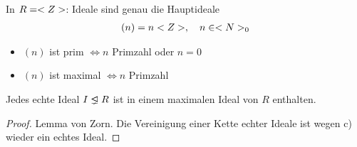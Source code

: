\begin{example}
	In $R = <Z>$: Ideale sind genau die Hauptideale
	\begin{align}
		(n) = n<Z>,\quad n \in <N>_0\notag
	\end{align}
	\begin{itemize}
		\item $(n)$ ist prim $\Leftrightarrow n$ Primzahl oder $n = 0$
		\item $(n)$ ist maximal $\Leftrightarrow n$ Primzahl
	\end{itemize}
\end{example}

\begin{proposition}
	Jedes echte Ideal $I \properideal R$ ist in einem maximalen Ideal von $R$ enthalten.
\end{proposition}
\begin{proof}
	Lemma von Zorn. Die Vereinigung einer Kette echter Ideale ist wegen c) wieder ein echtes Ideal.
\end{proof}
